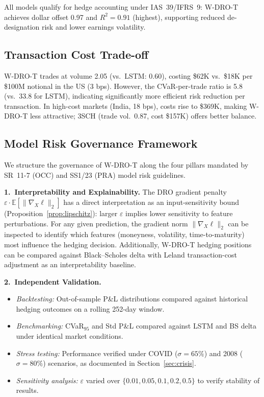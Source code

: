 \documentclass[11pt]{article}
\newcommand{\E}{\mathbb{E}}
\begin{document}
All models qualify for hedge accounting under IAS~39/IFRS~9: W-DRO-T achieves dollar offset 0.97 and $R^2 = 0.91$ (highest), supporting reduced de-designation risk and lower earnings volatility.

\subsection{Transaction Cost Trade-off}

W-DRO-T trades at volume 2.05 (vs.\ LSTM: 0.60), costing \$62K vs.\ \$18K per \$100M notional in the US (3 bps). However, the CVaR-per-trade ratio is 5.8 (vs.\ 33.8 for LSTM), indicating significantly more efficient risk reduction per transaction. In high-cost markets (India, 18 bps), costs rise to \$369K, making W-DRO-T less attractive; 3SCH (trade vol.\ 0.87, cost \$157K) offers better balance.

\subsection{Model Risk Governance Framework}

We structure the governance of W-DRO-T along the four pillars mandated by SR~11-7 (OCC) and SS1/23 (PRA) model risk guidelines.

\textbf{1.\ Interpretability and Explainability.}
The DRO gradient penalty $\varepsilon\cdot\E[\|\nabla_X\ell\|_2]$ has a direct interpretation as an input-sensitivity bound (Proposition~\ref{prop:lipschitz}): larger $\varepsilon$ implies lower sensitivity to feature perturbations.  For any given prediction, the gradient norm $\|\nabla_X\ell\|_2$ can be inspected to identify which features (moneyness, volatility, time-to-maturity) most influence the hedging decision.  Additionally, W-DRO-T hedging positions can be compared against Black--Scholes delta with Leland transaction-cost adjustment as an interpretability baseline.

\textbf{2.\ Independent Validation.}
\begin{itemize}[noitemsep]
    \item \textit{Backtesting:} Out-of-sample P\&L distributions compared against historical hedging outcomes on a rolling 252-day window.
    \item \textit{Benchmarking:} CVaR$_{95}$ and Std P\&L compared against LSTM and BS delta under identical market conditions.
    \item \textit{Stress testing:} Performance verified under COVID ($\sigma=65\%$) and 2008 ($\sigma=80\%$) scenarios, as documented in Section~\ref{sec:crisis}.
    \item \textit{Sensitivity analysis:} $\varepsilon$ varied over $\{0.01, 0.05, 0.1, 0.2, 0.5\}$ to verify stability of results.
\end{itemize}
\end{document}
